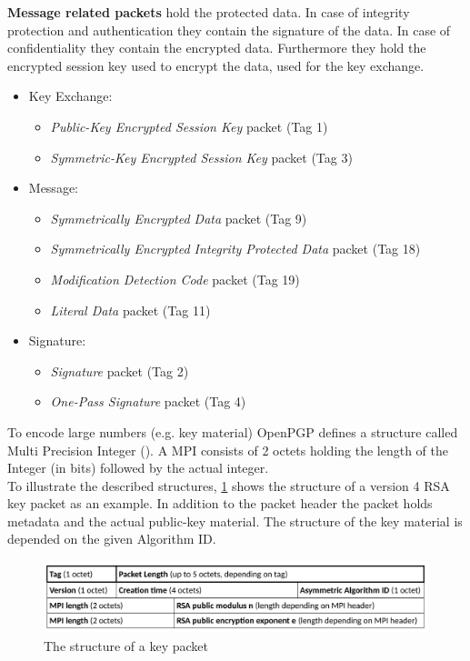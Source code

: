 \textbf{Message related packets} hold the protected data. In case of integrity protection and authentication they contain the signature of the data. In case of confidentiality they contain the encrypted data.
Furthermore they hold the encrypted session key used to encrypt the data, used for the key exchange.

\begin{itemize}
	\item Key Exchange:
	\begin{itemize}
		\item \textit{Public-Key Encrypted Session Key} packet (Tag 1)
		\item \textit{Symmetric-Key Encrypted Session Key} packet (Tag 3)
	\end{itemize}
	
	\item Message:
	\begin{itemize}
		\item \textit{Symmetrically Encrypted Data} packet (Tag 9)
		\item \textit{Symmetrically Encrypted Integrity Protected Data} packet (Tag 18)
		\item \textit{Modification Detection Code} packet (Tag 19)
		\item \textit{Literal Data} packet (Tag 11)
	\end{itemize}
	
	\item Signature:
	\begin{itemize}
		\item \textit{Signature} packet (Tag 2)
		\item \textit{One-Pass Signature} packet (Tag 4)
	\end{itemize}
\end{itemize}

To encode large numbers (e.g. key material) OpenPGP defines a structure called Multi Precision Integer (). A MPI consists of 2 octets holding the length of the Integer (in bits) followed by the actual integer. \\


To illustrate the described structures, \ref{fig:packet-key} shows the structure of a version 4 RSA key packet as an example. In addition to the packet header the packet holds metadata and the actual public-key material. The structure of the key material is depended on the given Algorithm ID.

\begin{figure}[h!]
\centering
\includegraphics[width=1\linewidth]{figures/packet-key.png}
\caption[]{The structure of a key packet}
\label{fig:packet-key}
\end{figure}


